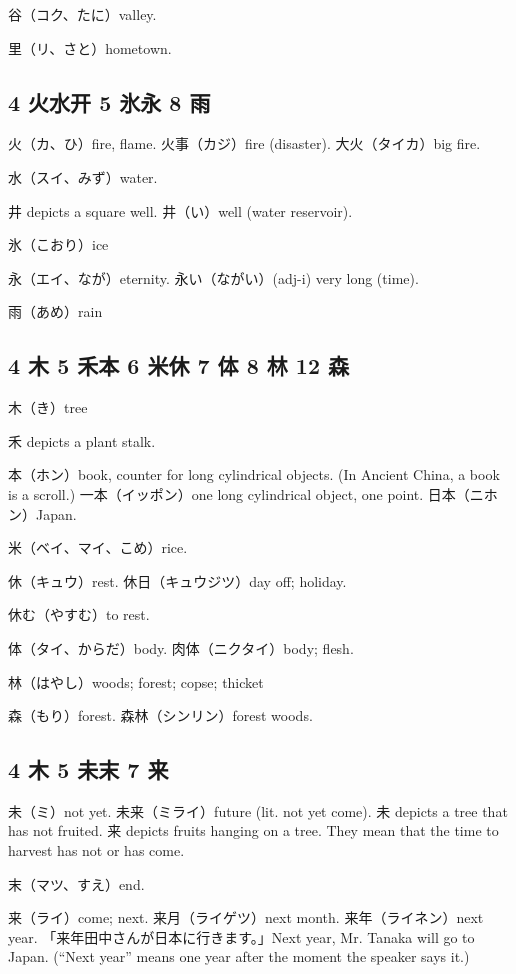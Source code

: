 谷（コク、たに）valley.

里（リ、さと）hometown.

\subsection{4 火水开 5 氷永 8 雨}

火（カ、ひ）fire, flame.
火事（カジ）fire (disaster).
大火（タイカ）big fire.

水（スイ、みず）water.

井 depicts a square well.
井（い）well (water reservoir).

氷（こおり）ice

永（エイ、なが）eternity.
永い（ながい）(adj-i) very long (time).

雨（あめ）rain

\subsection{4 木 5 禾本 6 米休 7 体 8 林 12 森}

木（き）tree

禾 depicts a plant stalk.

本（ホン）book, counter for long cylindrical objects.
(In Ancient China, a book is a scroll.)
一本（イッポン）one long cylindrical object, one point.
日本（ニホン）Japan.

米（ベイ、マイ、こめ）rice.

休（キュウ）rest.
休日（キュウジツ）day off; holiday.

休む（やすむ）to rest.

体（タイ、からだ）body.
肉体（ニクタイ）body; flesh.

林（はやし）woods; forest; copse; thicket

森（もり）forest.
森林（シンリン）forest woods.

\subsection{4 木 5 未末 7 来}

未（ミ）not yet.
未来（ミライ）future (lit. not yet come).
未 depicts a tree that has not fruited.
来 depicts fruits hanging on a tree.
They mean that the time to harvest has not or has come.

末（マツ、すえ）end.

来（ライ）come; next.
来月（ライゲツ）next month.
来年（ライネン）next year.
「来年田中さんが日本に行きます。」Next year, Mr. Tanaka will go to Japan.
(``Next year'' means one year after the moment the speaker says it.)

